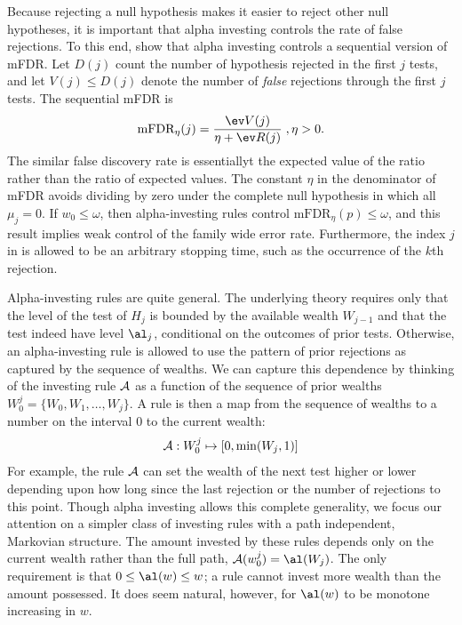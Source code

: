 \documentclass[12pt]{article}
\begin{document}
 Because rejecting a null hypothesis makes it easier to reject other null
 hypotheses, it is important that alpha investing controls the rate of false
 rejections.  To this end, \citet{fosterstine08} show that alpha investing
 controls a sequential version of mFDR.  Let $D(j)$ count the number of
 hypothesis rejected in the first $j$ tests, and let $V(j) \le D(j)$ denote the
 number of {\em false} rejections through the first $j$ tests.  The sequential mFDR is
 \begin{equation}
    \mbox{mFDR}_\eta(j) = \frac{\ev V(j)}{\eta + \ev R(j)} \;, \eta > 0.
 \label{eq:mFDR}
 \end{equation}
 The similar false discovery rate is essentiallyt the expected value of the
 ratio rather than the ratio of expected values.  The constant $\eta$ in the
 denominator of mFDR avoids dividing by zero under the complete null hypothesis
 in which all $\mu_j = 0$.  If $w_0 \le \omega$, then alpha-investing rules
 control $\mbox{mFDR}_\eta(p) \le \omega$, and this result implies weak control
 of the family wide error rate.  Furthermore, the index $j$ in  is
 allowed to be an arbitrary stopping time, such as the occurrence of the $k$th
 rejection.

 
 Alpha-investing rules are quite general.  The underlying theory requires only
 that the level of the test of $H_j$ is bounded by the available wealth
 $W_{j-1}$ and that the test indeed have level $\al_j$, conditional on the
 outcomes of prior tests.  Otherwise, an alpha-investing rule is allowed to use
 the pattern of prior rejections as captured by the sequence of wealths.  We can
 capture this dependence by thinking of the investing rule ${\cal A}$ as a
 function of the sequence of prior wealths $W_0^j = \{W_0, W_1, \ldots, W_j\}$.
  A rule is then a map from the sequence of wealths to a number on the interval
 0 to the current wealth:
 \begin{equation}
    {\cal A}: W_0^j \mapsto [0, \min(W_j,1)]    
 \label{eq:A}
 \end{equation}
 For example, the rule $\cal A$ can set the wealth of the next test higher or
 lower depending upon how long since the last rejection or the number of
 rejections to this point.  Though alpha investing allows this complete
 generality, we focus our attention on a simpler class of investing rules with a
 path independent, Markovian structure.  The amount invested by these rules
 depends only on the current wealth rather than the full path, ${\cal A}(w_0^j)
 = \al(W_j)$.  The only requirement is that $0 \le \al(w) \le w$; a rule cannot
 invest more wealth than the amount possessed.  It does seem natural, however,
 for $\al(w)$ to be monotone increasing in $w$.
\end{document}
